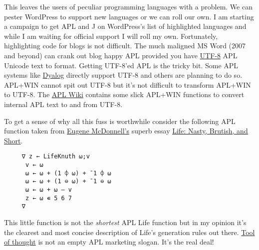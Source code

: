 This leaves the users of peculiar programming languages with a problem.
We can pester WordPress to support new languages or we can roll our own.
I am starting a campaign to get APL and J on WordPress's list of
highlighted languages and while I am waiting for official support I will
roll my own. Fortunately, highlighting code for blogs is not difficult.
The much maligned MS Word (2007 and beyond) can crank out blog happy APL
provided you have \href{http://unicode.org/faq/utf\_bom.html}{UTF-8} APL
Unicode text to format. Getting UTF-8'ed APL is the tricky bit. Some APL
systems like \href{http://www.dyalog.com/}{Dyalog} directly support
UTF-8 and others are planning to do so. APL+WIN cannot spit out UTF-8
but it's not difficult to transform APL+WIN to UTF-8. The
\href{http://aplwiki.com/AplToUnicodeII}{APL Wiki} contains some slick
APL+WIN functions to convert internal APL text to and from UTF-8.

To get a sense of why all this fuss is worthwhile consider the following
APL function taken from
\href{http://en.wikipedia.org/wiki/Eugene\_McDonnell}{Eugene
McDonnell's} superb essay
\href{http://www.jsoftware.com/papers/eem/life.htm}{Life: Nasty,
Brutish, and Short}.

\setmonofont{APL385}
\begin{verbatim}
     ∇ z ← LifeKnuth ⍵;v
      v ← ⍵
      ⍵ ← ⍵ + (1 ⌽ ⍵) + ¯1 ⌽ ⍵
      ⍵ ← ⍵ + (1 ⊖ ⍵) + ¯1 ⊖ ⍵
      ⍵ ← ⍵ + ⍵ – v
      z ← ⍵ ∊ 5 6 7
     ∇
\end{verbatim}
\setmonofont[Scale=MatchLowercase]{Ubuntu Mono}

This little function is not the \emph{shortest} APL Life function but in
my opinion it's the clearest and most concise description of Life's
generation rules out there.
\href{http://www.jsoftware.com/papers/tot.htm}{Tool of thought} is not
an empty APL marketing slogan. It's the real deal!




%